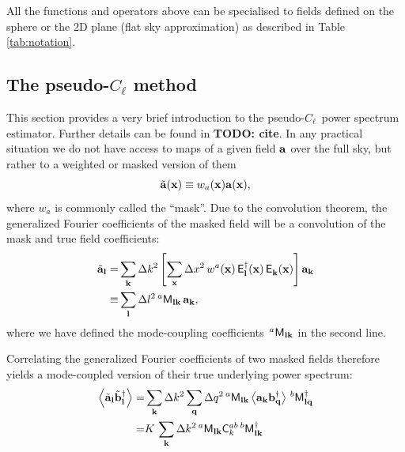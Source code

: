 \documentclass[a4paper,11pt]{article}
\newcommand{\todo}[1]{{\bf TODO: #1}}
\newcommand{\PCL}{pseudo-$C_\ell$~}
\newcommand{\summ}[1]{\sum_{\bf #1}\Delta #1^2}
\newcommand{\Ylm}[3]{{\sf E}^{#1}_{\bf #2}({\bf #3})}
\begin{document}
      All the functions and operators above can be specialised to fields defined on the sphere or the 2D plane (flat sky approximation) as described in Table \ref{tab:notation}.

    \subsection{The pseudo-$C_\ell$ method}\label{ssec:theory.pcl}
      This section provides a very brief introduction to the \PCL power spectrum estimator. Further details can be found in \todo{cite}. 
      In any practical situation we do not have access to maps of a given field ${\bf a}$ over the full sky, but rather to a weighted or masked version of them
      \begin{equation}
        \tilde{\bf a}({\bf x})\equiv w_a({\bf x}){\bf a}({\bf x}),
        \label{eq:mask}
      \end{equation}
      where $w_a$ is commonly called the ``mask''. Due to the convolution theorem, the generalized Fourier coefficients of the masked field will be a convolution of the mask and true field coefficients:
      \begin{align}\nonumber
        \tilde{\bf a}_{\bf l}=&\summ{k}\left[\summ{x}\,w^a({\bf x})\,\Ylm{\dag}{l}{x}\,\Ylm{}{k}{x}\right]{\bf a}_{\bf k}\\
                        \equiv&\summ{l}\,^a{\sf M}_{{\bf l}{\bf k}}\,{\bf a}_{\bf k},
      \end{align}
      where we have defined the mode-coupling coefficients $\,^a{\sf M}_{{\bf l}{\bf k}}$ in the second line.
    
      Correlating the generalized Fourier coefficients of two masked fields therefore yields a mode-coupled version of their true underlying power spectrum:
      \begin{align}\nonumber
        \left\langle\tilde{\bf a}_{\bf l}\tilde{\bf b}^\dag_{\bf l}\right\rangle=&\summ{k}\summ{q}\,^a{\sf M}_{{\bf l}{\bf k}}\left\langle{\bf a}_{\bf k}{\bf b}^\dag_{\bf q}\right\rangle\,^b{\sf M}^\dag_{{\bf l}{\bf q}}\\
                                                                              =&K\,\summ{k}\,^a{\sf M}_{{\bf l}{\bf k}}{\sf C}^{ab}_k\,^b{\sf M}^\dag_{{\bf l}{\bf k}} \label{eq:M}                                                                             
      \end{align}
    
\end{document}
